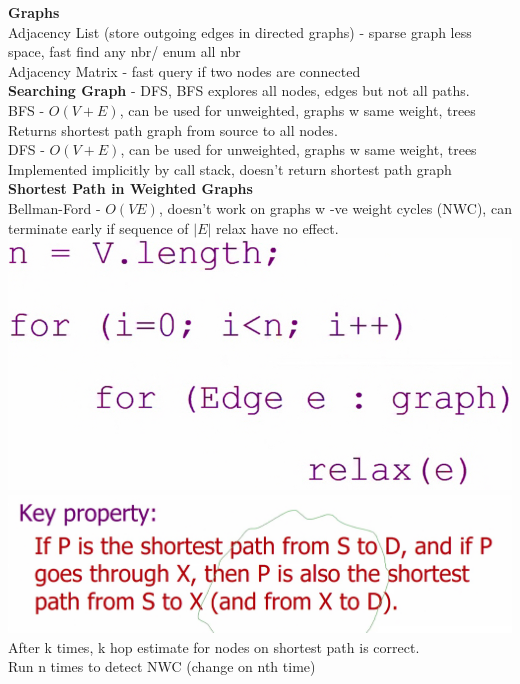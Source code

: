 \documentclass[10pt, a4paper]{article}
\begin{document}
\begin{multicols*}{3}
		{\normalsize\textbf{Graphs}}\\
		Adjacency List (store outgoing edges in directed graphs) - sparse graph less space, fast find any nbr/ enum all nbr\\
		Adjacency Matrix - fast query if two nodes are connected\\
		\textbf{Searching Graph} - DFS, BFS explores all nodes, edges but not all paths.\\
		BFS - $O(V + E)$, can be used for unweighted, graphs w same weight, trees\\
		Returns shortest path graph from source to all nodes.\\
		DFS - $O(V + E)$, can be used for unweighted, graphs w same weight, trees\\
		Implemented implicitly by call stack, doesn't return shortest path graph\\
		\textbf{Shortest Path in Weighted Graphs}\\
		Bellman-Ford - $O(VE)$, doesn't work on graphs w -ve weight cycles (NWC), can terminate early if sequence of $|E|$ relax have no effect.\\
		\includegraphics[scale=.12]{BF}
		\includegraphics[scale=.1]{BF2}
		After k times, k hop estimate for nodes on shortest path is correct.\\
		Run n times to detect NWC (change on nth time)\\ 

\end{multicols*}
\end{document}
